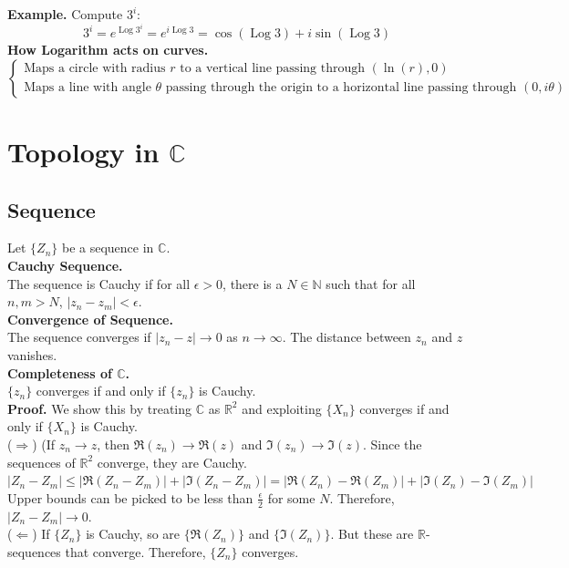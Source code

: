 \documentclass[11pt]{article}
\begin{document}
\textbf{Example.} Compute $3^i$: \\
$$3^i = e^{\operatorname{Log}{3^i}} = e^{i\operatorname{Log}{3}} = \cos{(\operatorname{Log}{3})} + i \sin{(\operatorname{Log}{3})}$$
\newline
\textbf{How Logarithm acts on curves. }\\
\[ \begin{cases} 
      \mbox{Maps a circle with radius } r \mbox{ to a vertical line passing through } (\ln(r), 0)\\
      \mbox{Maps a line with angle } \theta \mbox{ passing through the origin to a horizontal line passing through } (0, i\theta)
   \end{cases}
\]

\newpage
\section{Topology in $\mathbb{C}$}
\subsection{Sequence}
Let $\{Z_n\}$ be a sequence in $\mathbb{C}$. \\
\newline
\textbf{Cauchy Sequence. }\\
The sequence is Cauchy if for all $\epsilon > 0$, there is a $N \in \mathbb{N}$ such that for all $n, m > N$, $|z_n - z_m| < \epsilon$. \\
\newline
\textbf{Convergence of Sequence.}\\ 
The sequence converges if $|z_n - z| \to 0$ as $n \to \infty$. The distance between $z_n$ and $z$ vanishes. \\
\newline
\textbf{Completeness of $\mathbb{C}$.} \\
$\{z_n\}$ converges if and only if $\{z_n\}$ is Cauchy. \\
\textbf{Proof.} 
We show this by treating $\mathbb{C}$ as $\mathbb{R}^2$ and exploiting $\{X_n\}$ converges if and only if $\{X_n\}$ is Cauchy. \\
($\Longrightarrow$) (If $z_n \to z$, then $\Re(z_n) \to \Re(z)$ and $\Im(z_n) \to \Im(z)$. Since the sequences of $\mathbb{R}^2$ converge, they are Cauchy. \\
$|Z_n - Z_m| \leqslant |\Re(Z_n - Z_m)| +  |\Im(Z_n - Z_m)| = |\Re(Z_n) - \Re(Z_m)| + |\Im(Z_n) - \Im(Z_m)|$ \\
Upper bounds can be picked to be less than $\frac{\epsilon}{2}$ for some $N$. Therefore, $|Z_n - Z_m| \to 0$. \\
\newline 
($\Longleftarrow$) If $\{Z_n\}$ is Cauchy, so are $\{\Re(Z_n)\}$ and $\{\Im(Z_n)\}$. But these are $\mathbb{R}$-sequences that converge. Therefore, $\{Z_n\}$ converges. 
\end{document}
